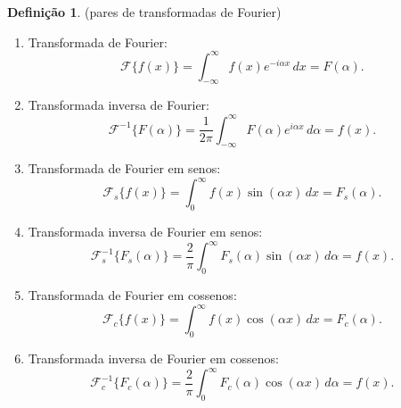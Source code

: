 \documentclass[12pt]{article}
\theoremstyle{plain}
\theoremstyle{definition}
\newtheorem{defn}{Definição}[section]
\theoremstyle{remark}
\begin{document}
\begin{defn} (pares de transformadas de Fourier)
    \begin{enumerate}
        \item[(i)] Transformada de Fourier: \begin{equation}
            \mathcal{F}\{f(x)\} = \int_{-\infty}^{\infty} f(x) e^{-i\alpha x} \, dx = F(\alpha).
        \end{equation}
        \item[(ii)] Transformada inversa de Fourier: \begin{equation}
            \mathcal{F}^{-1}\{F(\alpha)\} = \frac{1}{2\pi} \int_{-\infty}^{\infty} F(\alpha) e^{i\alpha x} \, d\alpha = f(x).
        \end{equation}
        \item[(iii)] Transformada de Fourier em senos: \begin{equation}
            \mathcal{F}_s\{f(x)\} = \int_{0}^{\infty} f(x) \sin(\alpha x) \, dx = F_s(\alpha).
        \end{equation}
        \item[(iv)] Transformada inversa de Fourier em senos: \begin{equation}
            \mathcal{F}_s^{-1}\{F_s(\alpha)\} = \frac{2}{\pi} \int_{0}^{\infty} F_s(\alpha) \sin(\alpha x) \, d\alpha = f(x).
        \end{equation}
        \item[(v)] Transformada de Fourier em cossenos: \begin{equation}
            \mathcal{F}_c\{f(x)\} = \int_{0}^{\infty} f(x) \cos(\alpha x) \, dx = F_c(\alpha).
        \end{equation}
        \item[(vi)] Transformada inversa de Fourier em cossenos: \begin{equation}
            \mathcal{F}_c^{-1}\{F_c(\alpha)\} = \frac{2}{\pi} \int_{0}^{\infty} F_c(\alpha) \cos(\alpha x) \, d\alpha = f(x).
        \end{equation}
    \end{enumerate}
\end{defn}
\end{document}
